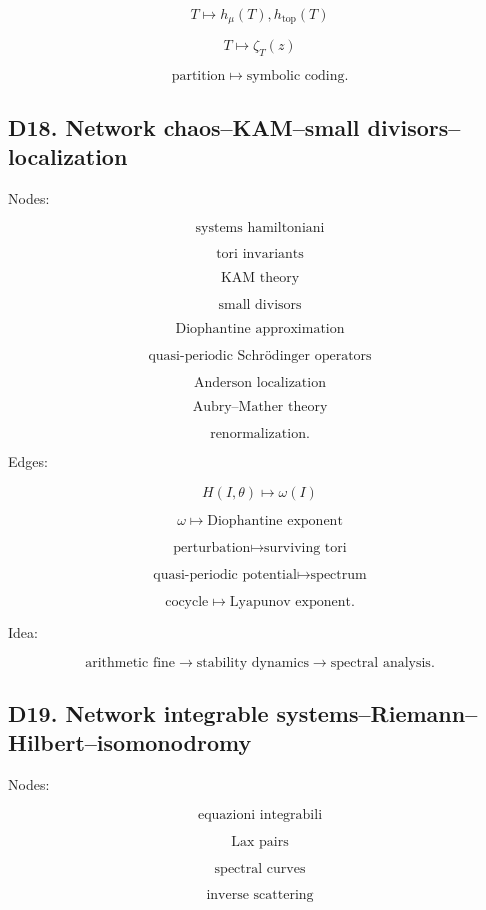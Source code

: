 \documentclass[11pt]{article}
\begin{document}
\[
T\mapsto h_\mu(T),h_{\mathrm{top}}(T)
\]

\[
T\mapsto \zeta_T(z)
\]

\[
\text{partition}\mapsto \text{symbolic coding}.
\]



\subsection{D18. Network chaos--KAM--small divisors--localization}

Nodes:

\[
\text{systems hamiltoniani}
\]

\[
\text{tori invariants}
\]

\[
\text{KAM theory}
\]

\[
\text{small divisors}
\]

\[
\text{Diophantine approximation}
\]

\[
\text{quasi-periodic Schrödinger operators}
\]

\[
\text{Anderson localization}
\]

\[
\text{Aubry--Mather theory}
\]

\[
\text{renormalization}.
\]

Edges:

\[
H(I,\theta)\mapsto \omega(I)
\]

\[
\omega\mapsto \text{Diophantine exponent}
\]

\[
\text{perturbation}\mapsto \text{surviving tori}
\]

\[
\text{quasi-periodic potential}\mapsto \text{spectrum}
\]

\[
\text{cocycle}\mapsto \text{Lyapunov exponent}.
\]

Idea:

\[
\text{arithmetic fine}
\to
\text{stability dynamics}
\to
\text{spectral analysis}.
\]



\subsection{D19. Network integrable systems--Riemann--Hilbert--isomonodromy}

Nodes:

\[
\text{equazioni integrabili}
\]

\[
\text{Lax pairs}
\]

\[
\text{spectral curves}
\]

\[
\text{inverse scattering}
\]
\end{document}
